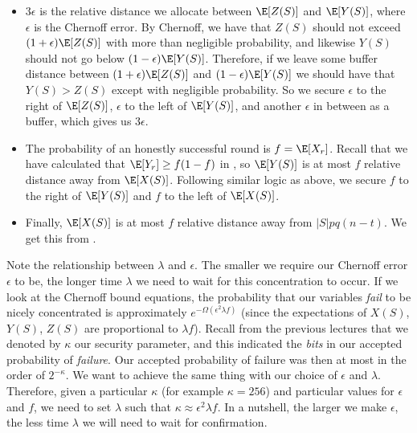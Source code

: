 \begin{itemize}
    \item $3 \epsilon$ is the relative distance we allocate between $\E[Z(S)]$ and $\E[Y(S)]$, where $\epsilon$ is the Chernoff error. By Chernoff, we have that $Z(S)$ should not exceed $(1+\epsilon)\E[Z(S)]$ with more than negligible probability, and likewise $Y(S)$ should not go below $(1-\epsilon)\E[Y(S)]$. Therefore, if we leave some buffer distance between $(1+\epsilon)\E[Z(S)]$ and $(1-\epsilon)\E[Y(S)]$ we should have that $Y(S) > Z(S)$ except with negligible probability. So we secure $\epsilon$ to the right of $\E[Z(S)]$, $\epsilon$ to the left of $\E[Y(S)]$, and another $\epsilon$ in between as a buffer, which gives us $3 \epsilon$.

    \item The probability of an honestly successful round is $f=\E[X_r]$. Recall that we have calculated that $\E[Y_r] \geq f (1-f)$ in , so $\E[Y(S)]$ is at most $f$ relative distance away from $\E[X(S)]$. Following similar logic as above, we secure $f$ to the right of $\E[Y(S)]$ and $f$ to the left of $\E[X(S)]$.

    \item Finally, $\E[X(S)]$ is at most $f$ relative distance away from $|S|pq(n-t)$. We get this from .

\end{itemize}

Note the relationship between $\lambda$ and $\epsilon$. The smaller we require our Chernoff error $\epsilon$ to be, the longer time $\lambda$ we need to wait for this concentration to occur. If we look at the Chernoff bound equations, the probability that our variables \emph{fail} to be nicely concentrated is approximately $e^{-\Omega(\epsilon^2 \lambda f)}$ (since the expectations of $X(S)$, $Y(S)$, $Z(S)$ are proportional to $\lambda f$). Recall from the previous lectures that we denoted by $\kappa$ our security parameter, and this indicated the \emph{bits} in our accepted probability of \emph{failure}. Our accepted probability of failure was then at most in the order of $2^{-\kappa}$. We want to achieve the same thing with our choice of $\epsilon$ and $\lambda$. Therefore, given a particular $\kappa$ (for example $\kappa = 256$) and particular values for $\epsilon$ and $f$, we need to set $\lambda$ such that $\kappa \approx \epsilon^2 \lambda f$. In a nutshell, the larger we make $\epsilon$, the less time $\lambda$ we will need to wait for confirmation.

